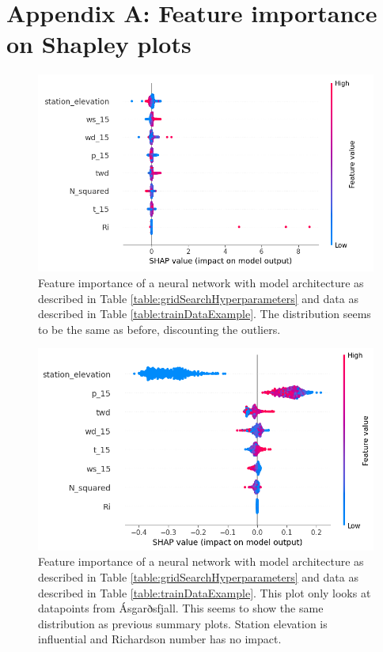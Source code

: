 \chapter*{Appendix A: Feature importance on Shapley plots}
\label{appendix:A}

\renewcommand{\thefigure}{A.\arabic{figure}} 
\setcounter{figure}{0} %

\begin{figure}[H]
    \centering
    \includegraphics[scale = 0.6]{Figures/shap_plots/summary_plot_190924_full_10ms.png}
    \caption[Summary feature importance of a neural network using entire dataset.]{Feature importance of a neural network with model architecture as described in Table \ref{table:gridSearchHyperparameters} and data as described in Table \ref{table:trainDataExample}. The distribution seems to be the same as before, discounting the outliers.}
    \label{fig:ShapleySummary3}
\end{figure}

\begin{figure}[H]
    \centering
    \includegraphics[scale = 0.6]{Figures/shap_plots/summary_plot_6745.png}
    \caption[Summary feature importance of a neural network only looking at AWS at Ásgarðsfjall.]{Feature importance of a neural network with model architecture as described in Table \ref{table:gridSearchHyperparameters} and data as described in Table \ref{table:trainDataExample}. This plot only looks at datapoints from Ásgarðsfjall. This seems to show the same distribution as previous summary plots. Station elevation is influential and Richardson number has no impact.}
    \label{fig:ShapleySummaryAsgarðsfjall}
\end{figure}

